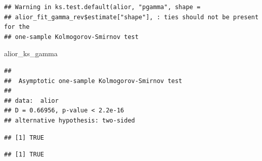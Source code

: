 \documentclass[
]{article}
\newenvironment{Shaded}{\begin{snugshade}}{\end{snugshade}}
\newcommand{\AttributeTok}[1]{\textcolor[rgb]{0.13,0.29,0.53}{#1}}
\newcommand{\FloatTok}[1]{\textcolor[rgb]{0.00,0.00,0.81}{#1}}
\newcommand{\FunctionTok}[1]{\textcolor[rgb]{0.13,0.29,0.53}{\textbf{#1}}}
\newcommand{\NormalTok}[1]{#1}
\newcommand{\OtherTok}[1]{\textcolor[rgb]{0.56,0.35,0.01}{#1}}
\newcommand{\SpecialCharTok}[1]{\textcolor[rgb]{0.81,0.36,0.00}{\textbf{#1}}}
\newcommand{\StringTok}[1]{\textcolor[rgb]{0.31,0.60,0.02}{#1}}
\begin{document}
\begin{verbatim}
## Warning in ks.test.default(alior, "pgamma", shape =
## alior_fit_gamma_rev$estimate["shape"], : ties should not be present for the
## one-sample Kolmogorov-Smirnov test
\end{verbatim}

\begin{Shaded}
\begin{Highlighting}[]
\NormalTok{alior\_ks\_gamma}
\end{Highlighting}
\end{Shaded}

\begin{verbatim}
## 
##  Asymptotic one-sample Kolmogorov-Smirnov test
## 
## data:  alior
## D = 0.66956, p-value < 2.2e-16
## alternative hypothesis: two-sided
\end{verbatim}

\begin{Shaded}
\end{Shaded}

\begin{verbatim}
## [1] TRUE
\end{verbatim}

\begin{Shaded}
\end{Shaded}

\begin{verbatim}
## [1] TRUE
\end{verbatim}

\begin{Shaded}
\end{Shaded}
\end{document}
